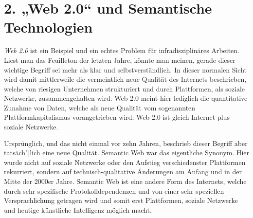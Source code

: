 \documentclass[a4paper,11pt]{article}
\begin{document}
\section*{2. „Web 2.0“ und Semantische Technologien}

\emph{Web 2.0} ist ein Beispiel und ein echtes Problem für infradisziplinäres
Arbeiten. Liest man das Feuilleton der letzten Jahre, könnte man meinen,
gerade dieser wichtige Begriff sei mehr als klar und selbstverständlich. In
dieser normalen Sicht wird damit mittlerweile die vermeintlich neue Qualität
des Internets beschrieben, welche von riesigen Unternehmen strukturiert und
durch Plattformen, als soziale Netzwerke, zusammengehalten wird. Web 2.0 meint
hier lediglich die quantitative Zunahme von Daten, welche als neue Qualität
vom sogenannten Plattformkapitalismus vorangetrieben wird; Web 2.0 ist gleich
Internet plus soziale Netzwerke.

Ursprünglich, und das nicht einmal vor zehn Jahren, beschrieb dieser Begriff
aber tatsäch"|lich eine neue Qualität. Semantic Web war das eigentliche
Synonym. Hier wurde nicht auf soziale Netzwerke oder den Aufstieg
verschiedenster Plattformen rekurriert, sondern auf technisch-qualitative
Änderungen am Anfang und in der Mitte der 2000er Jahre. Semantic Web ist eine
andere Form des Internets, welche durch sehr spezifische Protokolldependenzen
und von einer sehr speziellen Versprachlichung getragen wird und somit erst
Plattformen, soziale Netzwerke und heutige künstliche Intelligenz möglich
macht.
\end{document}
